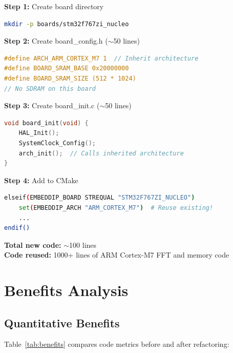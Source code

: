 \documentclass[11pt,a4paper]{article}
\begin{document}
\begin{tcolorbox}[colback=green!10!white,colframe=green!75!black,title=Example: Adding STM32F767ZI-Nucleo]

\textbf{Step 1:} Create board directory
\begin{lstlisting}[language=bash]
mkdir -p boards/stm32f767zi_nucleo
\end{lstlisting}

\textbf{Step 2:} Create board\_config.h ($\sim$50 lines)
\begin{lstlisting}[language=C]
#define ARCH_ARM_CORTEX_M7 1  // Inherit architecture
#define BOARD_SRAM_BASE 0x20000000
#define BOARD_SRAM_SIZE (512 * 1024)
// No SDRAM on this board
\end{lstlisting}

\textbf{Step 3:} Create board\_init.c ($\sim$50 lines)
\begin{lstlisting}[language=C]
void board_init(void) {
    HAL_Init();
    SystemClock_Config();
    arch_init();  // Calls inherited architecture
}
\end{lstlisting}

\textbf{Step 4:} Add to CMake
\begin{lstlisting}[language=bash]
elseif(EMBEDDIP_BOARD STREQUAL "STM32F767ZI_NUCLEO")
    set(EMBEDDIP_ARCH "ARM_CORTEX_M7")  # Reuse existing!
    ...
endif()
\end{lstlisting}

\textbf{Total new code:} $\sim$100 lines \\
\textbf{Code reused:} 1000+ lines of ARM Cortex-M7 FFT and memory code
\end{tcolorbox}

\section{Benefits Analysis}

\subsection{Quantitative Benefits}

Table~\ref{tab:benefits} compares code metrics before and after refactoring:
\end{document}
